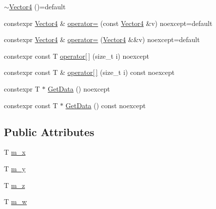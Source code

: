 \begin{DoxyCompactItemize}
\item 
\hyperlink{structmage_1_1_vector4_3_01_t_00_01typename_01std_1_1enable__if__t_3_01std_1_1is__arithmetic__v_3_01_t_01_4_01_4_01_4_adf95cf5784bcd1e2302df8fb733caeb6}{$\sim$\+Vector4} ()=default
\item 
constexpr \hyperlink{structmage_1_1_vector4}{Vector4} \& \hyperlink{structmage_1_1_vector4_3_01_t_00_01typename_01std_1_1enable__if__t_3_01std_1_1is__arithmetic__v_3_01_t_01_4_01_4_01_4_afd3b3ce2f9068d7f669f03b85821d43a}{operator=} (const \hyperlink{structmage_1_1_vector4}{Vector4} \&v) noexcept=default
\item 
constexpr \hyperlink{structmage_1_1_vector4}{Vector4} \& \hyperlink{structmage_1_1_vector4_3_01_t_00_01typename_01std_1_1enable__if__t_3_01std_1_1is__arithmetic__v_3_01_t_01_4_01_4_01_4_a81d82c4f3131e90422c4689ed650c62b}{operator=} (\hyperlink{structmage_1_1_vector4}{Vector4} \&\&v) noexcept=default
\item 
constexpr const T \hyperlink{structmage_1_1_vector4_3_01_t_00_01typename_01std_1_1enable__if__t_3_01std_1_1is__arithmetic__v_3_01_t_01_4_01_4_01_4_ae6db7335d3c1a4d2fb593410d24c8f22}{operator\mbox{[}$\,$\mbox{]}} (size\+\_\+t i) noexcept
\item 
constexpr const T \& \hyperlink{structmage_1_1_vector4_3_01_t_00_01typename_01std_1_1enable__if__t_3_01std_1_1is__arithmetic__v_3_01_t_01_4_01_4_01_4_a520748b98311f5bed3c70a03541559b1}{operator\mbox{[}$\,$\mbox{]}} (size\+\_\+t i) const noexcept
\item 
constexpr T $\ast$ \hyperlink{structmage_1_1_vector4_3_01_t_00_01typename_01std_1_1enable__if__t_3_01std_1_1is__arithmetic__v_3_01_t_01_4_01_4_01_4_af29ec8d43ddec186ff0a9aa9b22afc93}{Get\+Data} () noexcept
\item 
constexpr const T $\ast$ \hyperlink{structmage_1_1_vector4_3_01_t_00_01typename_01std_1_1enable__if__t_3_01std_1_1is__arithmetic__v_3_01_t_01_4_01_4_01_4_ae031ef9aa8b7c825edea1c115516f393}{Get\+Data} () const noexcept
\end{DoxyCompactItemize}
\subsection*{Public Attributes}
\begin{DoxyCompactItemize}
\item 
T \hyperlink{structmage_1_1_vector4_3_01_t_00_01typename_01std_1_1enable__if__t_3_01std_1_1is__arithmetic__v_3_01_t_01_4_01_4_01_4_a4baf276130c181cb4517b4d26452a163}{m\+\_\+x}
\item 
T \hyperlink{structmage_1_1_vector4_3_01_t_00_01typename_01std_1_1enable__if__t_3_01std_1_1is__arithmetic__v_3_01_t_01_4_01_4_01_4_ab435c72daf8024f10f5716e498a28248}{m\+\_\+y}
\item 
T \hyperlink{structmage_1_1_vector4_3_01_t_00_01typename_01std_1_1enable__if__t_3_01std_1_1is__arithmetic__v_3_01_t_01_4_01_4_01_4_aa70e34586181b0c7e380e28890656133}{m\+\_\+z}
\item 
T \hyperlink{structmage_1_1_vector4_3_01_t_00_01typename_01std_1_1enable__if__t_3_01std_1_1is__arithmetic__v_3_01_t_01_4_01_4_01_4_a04fbebeebf449c261d446f4b484cf387}{m\+\_\+w}
\end{DoxyCompactItemize}


